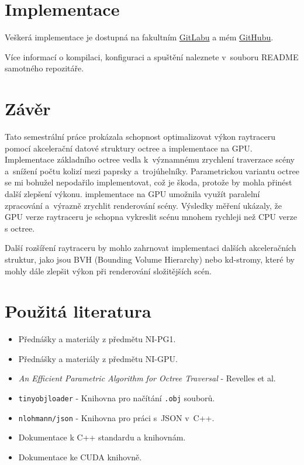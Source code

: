 \documentclass[10pt,a4paper]{article}
\begin{document}

\section{Implementace}

Veškerá implementace je dostupná na fakultním \href{https://gitlab.fit.cvut.cz/votruja6/pg1-raytracer#}{GitLabu} a mém \href{https://github.com/MasterVotr/PG1-raytracer}{GitHubu}.

Více informací o kompilaci, konfiguraci a spuštění naleznete v~souboru README samotného repozitáře.


\section{Závěr}

Tato semestrální práce prokázala schopnost optimalizovat výkon raytraceru pomocí akcelerační datové struktury octree a implementace na GPU. Implementace základního octree vedla k~významnému zrychlení traverzace scény a~snížení počtu kolizí mezi paprsky a~trojúhelníky. Parametrickou variantu octree se mi bohužel nepodařilo implementovat, což je škoda, protože by mohla přinést další zlepšení výkonu. implementace na GPU umožnila využít paralelní zpracování a~výrazně zrychlit renderování scény. Výsledky měření ukázaly, že GPU verze raytraceru je schopna vykreslit scénu mnohem rychleji než CPU verze s octree.

Další rozšíření raytraceru by mohlo zahrnovat implementaci dalších akceleračních struktur, jako jsou BVH (Bounding Volume Hierarchy) nebo kd-stromy, které by mohly dále zlepšit výkon při renderování složitějších scén.

\section{Použitá literatura}
\begin{itemize}
    \item Přednášky a materiály z předmětu NI-PG1.
    \item Přednášky a materiály z předmětu NI-GPU.
    \item \textit{An Efficient Parametric Algorithm for Octree Traversal} - Revelles et al.
    \item \texttt{tinyobjloader} - Knihovna pro načítání \texttt{.obj} souborů.
    \item \texttt{nlohmann/json} - Knihovna pro práci s~JSON v~C++.
    \item Dokumentace k C++ standardu a knihovnám.
    \item Dokumentace ke CUDA knihovně.
\end{itemize}
\end{document}
